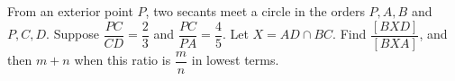 From an exterior point $P$, two secants meet a circle in the orders $P,A,B$ and $P,C,D$. Suppose $\dfrac{PC}{CD}=\dfrac{2}{3}$ and $\dfrac{PC}{PA}=\dfrac{4}{5}$. Let $X=AD\cap BC$. Find $\dfrac{[BXD]}{[BXA]}$, and then $m+n$ when this ratio is $\dfrac{m}{n}$ in lowest terms.

